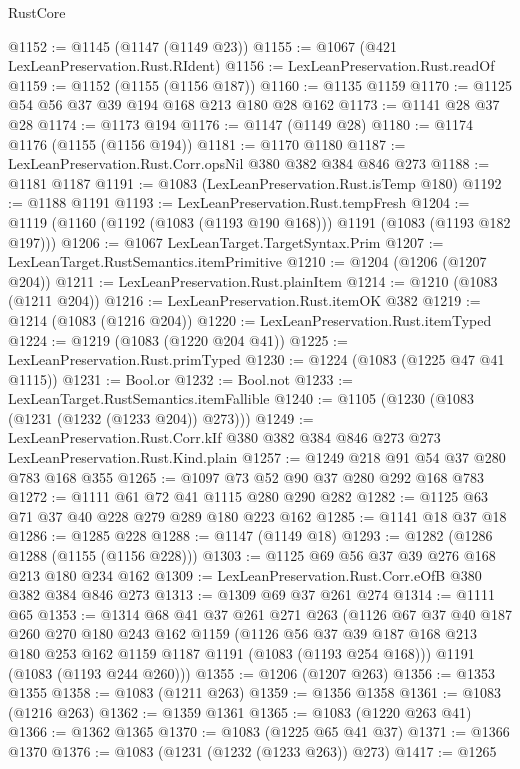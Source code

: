 \begin{lexlean}{RustCore}
\begin{coremodule}
@1152 := @1145 (@1147 (@1149 @23))
@1155 := @1067 (@421 LexLeanPreservation.Rust.RIdent)
@1156 := LexLeanPreservation.Rust.readOf
@1159 := @1152 (@1155 (@1156 @187))
@1160 := @1135 @1159
@1170 := @1125 @54 @56 @37 @39 @194 @168 @213 @180 @28 @162
@1173 := @1141 @28 @37 @28
@1174 := @1173 @194
@1176 := @1147 (@1149 @28)
@1180 := @1174 @1176 (@1155 (@1156 @194))
@1181 := @1170 @1180
@1187 := LexLeanPreservation.Rust.Corr.opsNil @380 @382 @384 @846 @273
@1188 := @1181 @1187
@1191 := @1083 (LexLeanPreservation.Rust.isTemp @180)
@1192 := @1188 @1191
@1193 := LexLeanPreservation.Rust.tempFresh
@1204 := @1119 (@1160 (@1192 (@1083 (@1193 @190 @168))) @1191 (@1083 (@1193 @182 @197)))
@1206 := @1067 LexLeanTarget.TargetSyntax.Prim
@1207 := LexLeanTarget.RustSemantics.itemPrimitive
@1210 := @1204 (@1206 (@1207 @204))
@1211 := LexLeanPreservation.Rust.plainItem
@1214 := @1210 (@1083 (@1211 @204))
@1216 := LexLeanPreservation.Rust.itemOK @382
@1219 := @1214 (@1083 (@1216 @204))
@1220 := LexLeanPreservation.Rust.itemTyped
@1224 := @1219 (@1083 (@1220 @204 @41))
@1225 := LexLeanPreservation.Rust.primTyped
@1230 := @1224 (@1083 (@1225 @47 @41 @1115))
@1231 := Bool.or
@1232 := Bool.not
@1233 := LexLeanTarget.RustSemantics.itemFallible
@1240 := @1105 (@1230 (@1083 (@1231 (@1232 (@1233 @204)) @273)))
@1249 := LexLeanPreservation.Rust.Corr.kIf
    @380
    @382
    @384
    @846
    @273
    @273
    LexLeanPreservation.Rust.Kind.plain
@1257 := @1249 @218 @91 @54 @37 @280 @783 @168 @355
@1265 := @1097 @73 @52 @90 @37 @280 @292 @168 @783
@1272 := @1111 @61 @72 @41 @1115 @280 @290 @282
@1282 := @1125 @63 @71 @37 @40 @228 @279 @289 @180 @223 @162
@1285 := @1141 @18 @37 @18
@1286 := @1285 @228
@1288 := @1147 (@1149 @18)
@1293 := @1282 (@1286 @1288 (@1155 (@1156 @228)))
@1303 := @1125 @69 @56 @37 @39 @276 @168 @213 @180 @234 @162
@1309 := LexLeanPreservation.Rust.Corr.eOfB @380 @382 @384 @846 @273
@1313 := @1309 @69 @37 @261 @274
@1314 := @1111 @65
@1353 := @1314
    @68
    @41
    @37
    @261
    @271
    @263
    (@1126
      @67
      @37
      @40
      @187
      @260
      @270
      @180
      @243
      @162
      @1159
      (@1126 @56 @37 @39 @187 @168 @213 @180 @253 @162 @1159 @1187 @1191 (@1083 (@1193 @254 @168)))
      @1191
      (@1083 (@1193 @244 @260)))
@1355 := @1206 (@1207 @263)
@1356 := @1353 @1355
@1358 := @1083 (@1211 @263)
@1359 := @1356 @1358
@1361 := @1083 (@1216 @263)
@1362 := @1359 @1361
@1365 := @1083 (@1220 @263 @41)
@1366 := @1362 @1365
@1370 := @1083 (@1225 @65 @41 @37)
@1371 := @1366 @1370
@1376 := @1083 (@1231 (@1232 (@1233 @263)) @273)
@1417 := @1265

\end{coremodule}
\end{lexlean}
